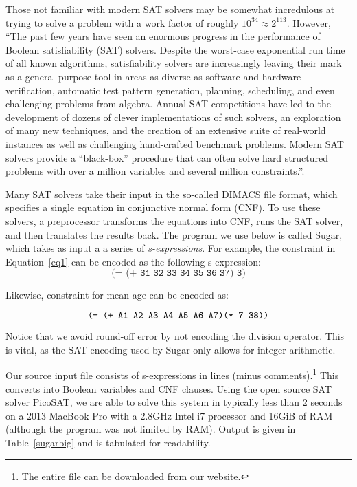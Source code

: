 \documentclass[runningheads]{llncs}
\begin{document}
Those not familiar with modern SAT solvers may be somewhat
incredulous at trying to  solve
a problem with a work factor of roughly $10^{34}\approx2^{113}$.
However, ``The past few years have seen an enormous progress in the performance
of Boolean satisfiability (SAT) solvers. Despite the worst-case
exponential run time of all known algorithms, satisfiability solvers
are increasingly leaving their mark as a general-purpose tool in areas
as diverse as software and hardware verification,
automatic test pattern generation, planning,
scheduling, and even challenging problems from algebra. Annual SAT
competitions have led to the development of dozens
of clever implementations of such solvers, an exploration of many new
techniques, and the creation of an extensive suite of real-world
instances as well as challenging hand-crafted benchmark
problems. Modern SAT solvers provide a ``black-box'' procedure that
can often solve hard structured problems with over a million variables and
several million constraints.''\cite[references omitted]{Gomes200889}.

Many SAT solvers take their input in the so-called DIMACS file format,
which specifies a single equation in conjunctive normal form (CNF). To use these solvers, a
preprocessor transforms the equations into CNF, runs the SAT solver,
and then translates the results back. The program we use below is
called Sugar\cite{sugar}, which takes as input a a series of
\textit{s-expressions}\cite{McCarthy:1960:RFS:367177.367199}. For
example, the constraint in Equation~\ref{eq1} can be encoded as the following
s-expression:
\begin{equation}
\texttt{(= (+ S1 S2 S3 S4 S5 S6 S7) 3)}
\end{equation}

Likewise, constraint for mean age can be encoded as:

\begin{equation}
\texttt{(= (+ A1 A2 A3 A4 A5 A6 A7)\\ (* 7 38))}
\end{equation}


Notice that we avoid round-off error by not encoding the division
operator. This is vital, as the SAT encoding used by Sugar only allows
for integer arithmetic. 

Our source input file consists of \NumSExpressions s-expressions in \NumConstraintLines{} lines (minus comments).\footnote{The entire file can be downloaded from our website.}
This converts into
\NumVariables Boolean variables and \NumClauses CNF clauses. Using the
open source SAT solver PicoSAT\cite{Biere_picosatessentials}, we are able
to solve this system in typically less than 2 seconds on a 2013 MacBook Pro with a 2.8GHz Intel
i7 processor and 16GiB of RAM (although the program was not limited by
RAM). Output is given in Table~\ref{sugarbig} and is tabulated for readability.
\end{document}

